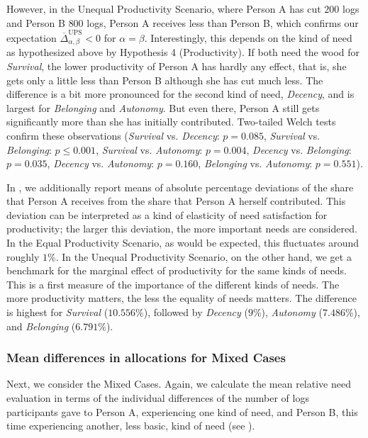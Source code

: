 \documentclass[10pt,letterpaper]{article}
\begin{document}
However, in the Unequal Productivity Scenario, where Person A has cut $200$ logs and Person B $800$ logs, Person A receives less than Person B, which confirms our expectation $\overline{\Delta}^\text{UPS}_{\alpha,\beta}<0$ for $\alpha=\beta$.
Interestingly, this depends on the kind of need as hypothesized above by Hypothesis 4 (Productivity).
If both need the wood for \textit{Survival}, the lower productivity of Person A has hardly any effect, that is, she gets only a little less than Person B although she has cut much less.
The difference is a bit more pronounced for the second kind of need, \textit{Decency}, and is largest for \textit{Belonging} and \textit{Autonomy}. But even there, Person A still gets significantly more than she has initially contributed. 
Two-tailed Welch tests confirm these observations (\textit{Survival} vs. \textit{Decency}: $p=0.085$, \textit{Survival} vs. \textit{Belonging}: $p\leq0.001$, \textit{Survival} vs. \textit{Autonomy}: $p=0.004$, \textit{Decency} vs. \textit{Belonging}: $p=0.035$, \textit{Decency} vs. \textit{Autonomy}: $p=0.160$, \textit{Belonging} vs. \textit{Autonomy}: $p=0.551$).

In , we additionally report means of absolute percentage deviations of the share that Person A receives from the share that Person A herself contributed.
This deviation can be interpreted as a kind of elasticity of need satisfaction for productivity; the larger this deviation, the more important needs are considered.
In the Equal Productivity Scenario, as would be expected, this fluctuates around roughly $1\%$.
In the Unequal Productivity Scenario, on the other hand, we get a benchmark for the marginal effect of productivity for the same kinds of needs.
This is a first measure of the importance of the different kinds of needs.
The more productivity matters, the less the equality of needs matters.
The difference is highest for \textit{Survival} ($10.556\%$), followed by \textit{Decency} ($9\%$), \textit{Autonomy} ($7.486\%$), and \textit{Belonging} ($6.791\%$).


\subsubsection*{Mean differences in allocations for Mixed Cases}\label{sec:results_mean_mixed}
Next, we consider the Mixed Cases.
Again, we calculate the mean relative need evaluation in terms of the individual differences of the number of logs participants gave to Person A, experiencing one kind of need, and Person B, this time experiencing another, less basic, kind of need (see ).
\end{document}
